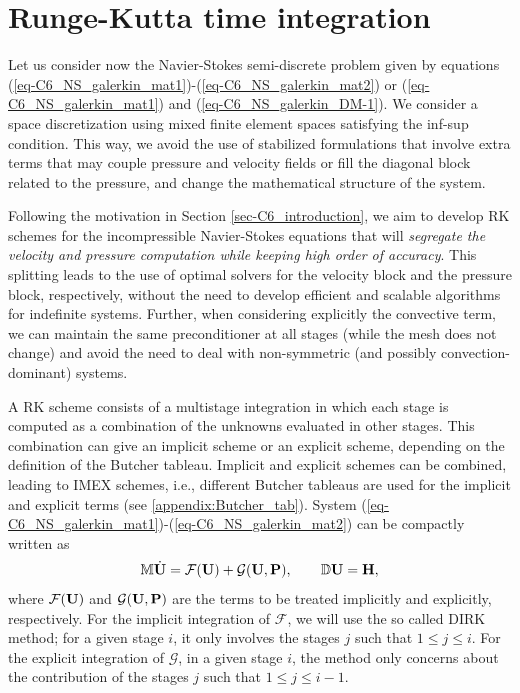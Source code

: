 \section{Runge-Kutta time integration}
\label{sec-C6_SRK_developement}
Let us consider now the Navier-Stokes semi-discrete problem given by equations (\ref{eq-C6_NS_galerkin_mat1})-(\ref{eq-C6_NS_galerkin_mat2}) or  (\ref{eq-C6_NS_galerkin_mat1})        and  (\ref{eq-C6_NS_galerkin_DM-1}). We consider a space discretization using mixed finite element spaces satisfying the inf-sup condition. This way, we avoid the use of stabilized formulations that involve extra terms that may couple pressure and velocity fields or fill the diagonal block related to the pressure, and change the mathematical structure of the system.

Following the motivation in Section \ref{sec-C6_introduction}, we aim to develop RK schemes for the incompressible Navier-Stokes equations that will \emph{segregate the velocity and pressure computation while keeping high order of accuracy}. This splitting leads to the use of optimal solvers for the velocity block and the pressure block, respectively, without the need to develop efficient and scalable algorithms for indefinite systems. Further, when considering explicitly the convective term, we can maintain the same preconditioner at all stages (while the mesh does not change) and avoid the need to deal with non-symmetric (and possibly convection-dominant) systems. 

A RK scheme consists of a multistage integration in which each stage is computed as a combination of the unknowns evaluated in other stages. This combination can give an implicit scheme or an explicit scheme, depending on the definition of the Butcher tableau. Implicit and explicit schemes can be combined, leading to IMEX schemes, i.e., different Butcher tableaus are used for the implicit and explicit terms (see \ref{appendix:Butcher_tab}). System (\ref{eq-C6_NS_galerkin_mat1})-(\ref{eq-C6_NS_galerkin_mat2}) can be compactly written as
\begin{equation}
\label{eq-C6_NS_galerkin_mat1_ope}
\mathbb{M}\dot{{\bf U}}=\mathcal{F}({\bf U})+\mathcal{G}({\bf U},{\bf P}), \qquad \mathbb{D} {\bf U} = \bf{H},
\end{equation}
where $\mathcal{F}({\bf U})$  and $\mathcal{G}({\bf U},{\bf P})$ are the terms to be treated implicitly and explicitly, respectively. 
For the implicit integration of $\mathcal{F}$, we will use the so called DIRK method; for a given stage $i$, it only involves the stages $j$ such that $1\leq j\leq i$. For the explicit integration of $\mathcal{G}$, in a given stage $i$, the method only concerns about the contribution of the stages $j$ such that $1\leq j\leq i-1$. 


